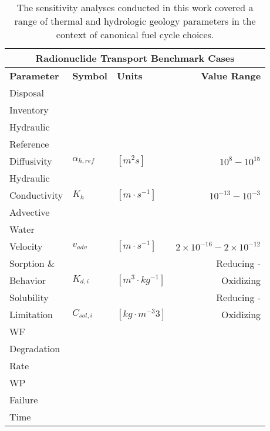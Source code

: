 
\begin{table}[ht!]
\centering
\footnotesize{
  \begin{tabularx}{\textwidth}{|X|l|l|r|}
\multicolumn{4}{c}{\textbf{Radionuclide Transport Benchmark Cases}}\\
\hline
\textbf{Parameter} & \textbf{Symbol} & \textbf{Units} & \textbf{Value Range} \\
\hline
Disposal& & & \\
Inventory& & & \\
\hline
Hydraulic & & & \\
Reference & & & \\
Diffusivity& $\alpha_{h,ref}$& $[m^2s]$ & $10^{8} - 10^{15}$ \\
\hline
Hydraulic & & & \\
Conductivity& $K_{h}$& $[m \cdot s^{-1}]$ & $10^{-13} - 10^{-3}$ \\
\hline
Advective  & & & \\
Water & & & \\
Velocity & $v_{adv}$ & $[m\cdot s^{-1}]$ & $2\times10^{-16}-2\times10^{-12}$ \\
\hline
Sorption \& & & & Reducing - \\
Behavior & $K_{d,i}$& $[m^3\cdot kg^{-1}]$ & Oxidizing \\
\hline
Solubility &  & & Reducing -\\
Limitation & $C_{sol,i}$ & $[kg\cdot m^{-3}3]$& Oxidizing \\
\hline
WF& & & \\
Degradation& & & \\
Rate& & & \\
\hline
WP& & & \\
Failure& & & \\
Time& & & \\
\hline
\end{tabularx}
\caption{The sensitivity analyses conducted in this work covered a range of 
thermal and hydrologic geology parameters in the context of canonical fuel cycle choices.}
}
\label{tab:nuclide_bench_tab}
\end{table}

